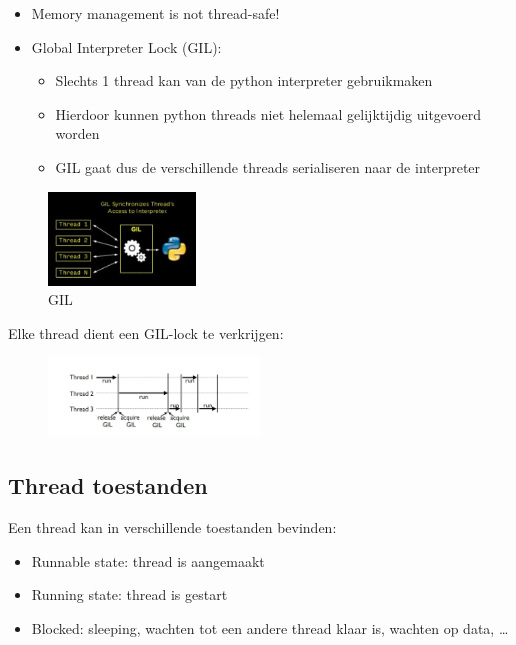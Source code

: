 \documentclass{article}
\begin{document}
\begin{itemize}
    \item Memory management is not thread-safe!
    \item Global Interpreter Lock (GIL):
    \begin{itemize}
        \item Slechts 1 thread kan van de python interpreter gebruikmaken
        \item Hierdoor kunnen python threads niet helemaal gelijktijdig uitgevoerd worden
        \item GIL gaat dus de verschillende threads serialiseren naar de interpreter
    \end{itemize}
\end{itemize}

\begin{figure}[H]
    \centering
    \includegraphics[width=0.35\textwidth]{python-gil.png}
    \caption{GIL}
\end{figure}

Elke thread dient een GIL-lock te verkrijgen:

\begin{figure}[H]
    \centering
    \includegraphics[width=0.5\textwidth]{python-gil2.png}
\end{figure}

\subsection{Thread toestanden}

Een thread kan in verschillende toestanden bevinden:

\begin{itemize}
    \item Runnable state: thread is aangemaakt
    \item Running state: thread is gestart
    \item Blocked: sleeping, wachten tot een andere thread klaar is, wachten op data, \dots
\end{itemize}
\end{document}
